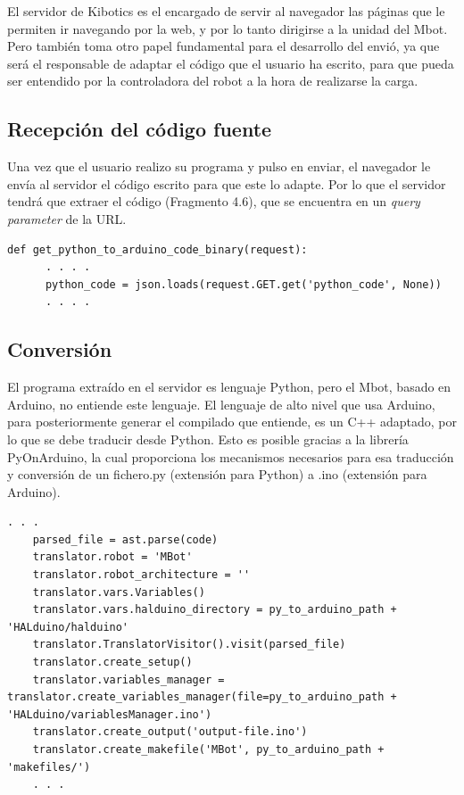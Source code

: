 \documentclass{report}
\begin{document}
El servidor de Kibotics es el encargado de servir al navegador las páginas que le permiten ir navegando por la web, y por lo tanto dirigirse a la unidad del Mbot. Pero también toma otro papel fundamental para el desarrollo del envió, ya que será el responsable de adaptar el código que el usuario ha escrito, para que pueda ser entendido por la controladora del robot a la hora de realizarse la carga.

\subsection{Recepción del código fuente}
Una vez que el usuario realizo su programa y pulso en enviar, el navegador le envía al servidor el código escrito para que este lo adapte. Por lo que el servidor tendrá que extraer el código (Fragmento 4.6), que se encuentra en un \textit{query parameter} de la URL.
\\
\begin{lstlisting}[frame=single,breaklines=true, label=Extracción del programa en el servidor, caption=Extracción programa en el servidor, captionpos=b]
   def get_python_to_arduino_code_binary(request):
      . . . .
      python_code = json.loads(request.GET.get('python_code', None))
      . . . .

\end{lstlisting}

\subsection{Conversión}

El programa extraído en el servidor es lenguaje Python, pero el Mbot, basado en Arduino, no entiende este lenguaje. El lenguaje de alto nivel que usa Arduino, para posteriormente generar el compilado que entiende, es un C++ adaptado, por lo que se debe traducir desde Python. Esto es posible gracias a la librería PyOnArduino, la cual proporciona los mecanismos necesarios para esa traducción y conversión de un fichero.py (extensión para Python) a .ino (extensión para Arduino).
\\
\begin{lstlisting}[frame=single,breaklines=true, label=Traducción de lenguaje Python a Arduino, caption=Traducción de lenguaje Python a Arduino, captionpos=b]
   . . .    
    parsed_file = ast.parse(code)
    translator.robot = 'MBot'
    translator.robot_architecture = ''
    translator.vars.Variables()
    translator.vars.halduino_directory = py_to_arduino_path + 'HALduino/halduino'
    translator.TranslatorVisitor().visit(parsed_file)
    translator.create_setup()
    translator.variables_manager = translator.create_variables_manager(file=py_to_arduino_path + 'HALduino/variablesManager.ino')
    translator.create_output('output-file.ino')
    translator.create_makefile('MBot', py_to_arduino_path + 'makefiles/')
    . . .


\end{lstlisting}
\end{document}
